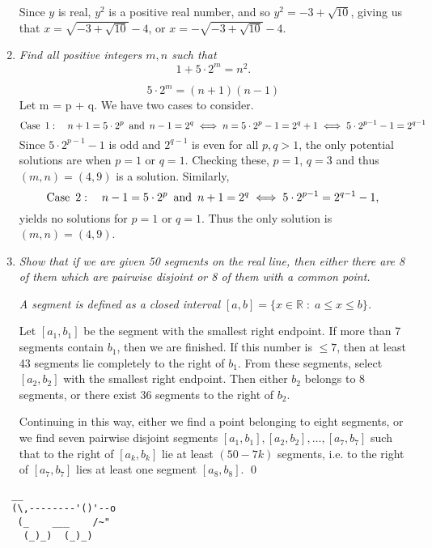 \documentclass{article}
\begin{document}
\begin{enumerate}
Since $y$ is real, $y^2$ is a positive real number, and so $y^2 = -3 + \sqrt{10}$, giving us that $x = \sqrt{-3 + \sqrt{10}} - 4$, or $x = -\sqrt{-3 + \sqrt{10}} - 4$.


\vspace{12pt}
\item %
\textit{Find all positive integers $m, n$ such that \[ 1 + 5 \cdot 2^m = n^2. \]}

\[ 5 \cdot 2^m = (n+1)(n-1) \]
Let m = p + q. We have two cases to consider.
 \[ \mathrm{Case} \enskip 1: \quad n + 1 = 5 \cdot 2^p \enskip \mathrm{and} \enskip n - 1 = 2^q
 \iff n = 5 \cdot 2^p - 1 = 2^q + 1
 \iff 5 \cdot 2^{p-1} - 1 = 2^{q-1} \]
Since $5 \cdot 2^{p-1} - 1$ is odd and $2^{q-1}$ is even for all $p, q > 1$, the only potential solutions are when $p = 1$ or $q = 1$. Checking these, $p = 1$, $q = 3$ and thus $(m, n) = (4, 9)$ is a solution. Similarly,
\[ \mathrm{Case} \enskip 2: \quad n - 1 = 5 \cdot 2^p \enskip \mathrm{and} \enskip n + 1 = 2^q 
\iff 5 \cdot 2^{p-1} = 2^{q-1} - 1, \] yields no solutions for $p = 1$ or $q = 1$. Thus the only solution is $(m, n) = (4, 9)$.


\vspace{12pt}
\item %
\textit{Show that if we are given 50 segments on the real line, then either there are 8 of them which are pairwise disjoint or 8 of them with a common point.}

\textit{A segment is defined as a closed interval $[a, b] = \{x \in \mathbb{R} \;:\; a \leq x \leq b \}$.}

Let $[a_1, b_1]$ be the segment with the smallest right endpoint. If more than 7 segments contain $b_1$, then we are finished. If this number is $\leq 7$, then at least 43 segments lie completely to the right of $b_1$. From these segments, select $[a_2, b_2]$ with the smallest right endpoint. Then either $b_2$ belongs to 8 segments, or there exist 36 segments to the right of $b_2$.

Continuing in this way, either we find a point belonging to eight segments, or we find seven pairwise disjoint segments $[a_1, b_1], [a_2, b_2], \dots, [a_7, b_7]$ such that to the right of $[a_k, b_k]$ lie at least $(50-7k)$ segments, i.e. to the right of $[a_7, b_7]$ lies at least one segment $[a_8, b_8]$. \qed 


\end{enumerate}


\vspace{12pt}
\begin{center}
\begin{BVerbatim}
  __
  (\,--------'()'--o
   (_    ___    /~"
    (_)_)  (_)_)
\end{BVerbatim}
\end{center}
\end{document}
